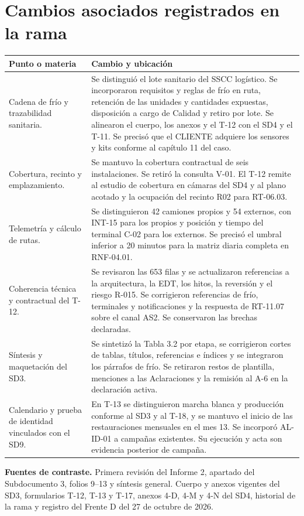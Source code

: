\documentclass[11pt,letterpaper]{article}
\begin{document}
\section*{Cambios asociados registrados en la rama}

\begin{longtable}{@{}P{0.33\textwidth}P{\tabcolsep\relax}@{}}
\hline
\textbf{Punto o materia} & \textbf{Cambio y ubicación} \\
\hline
\endhead
\hline
\endfoot
Cadena de frío y trazabilidad sanitaria. &
Se distinguió el lote sanitario del SSCC logístico. Se incorporaron requisitos y reglas de frío en ruta, retención de las unidades y cantidades expuestas, disposición a cargo de Calidad y retiro por lote. Se alinearon el cuerpo, los anexos y el T-12 con el SD4 y el T-11. Se precisó que el CLIENTE adquiere los sensores y kits conforme al capítulo 11 del caso. \\
Cobertura, recinto y emplazamiento. &
Se mantuvo la cobertura contractual de seis instalaciones. Se retiró la consulta V-01. El T-12 remite al estudio de cobertura en cámaras del SD4 y al plano acotado y la ocupación del recinto R02 para RT-06.03. \\
Telemetría y cálculo de rutas. &
Se distinguieron 42 camiones propios y 54 externos, con INT-15 para los propios y posición y tiempo del terminal C-02 para los externos. Se precisó el umbral inferior a 20 minutos para la matriz diaria completa en RNF-04.01. \\
Coherencia técnica y contractual del T-12. &
Se revisaron las 653 filas y se actualizaron referencias a la arquitectura, la EDT, los hitos, la reversión y el riesgo R-015. Se corrigieron referencias de frío, terminales y notificaciones y la respuesta de RT-11.07 sobre el canal AS2. Se conservaron las brechas declaradas. \\
Síntesis y maquetación del SD3. &
Se sintetizó la Tabla 3.2 por etapa, se corrigieron cortes de tablas, títulos, referencias e índices y se integraron los párrafos de frío. Se retiraron restos de plantilla, menciones a las Aclaraciones y la remisión al A-6 en la declaración activa. \\
Calendario y prueba de identidad vinculados con el SD9. &
En T-13 se distinguieron marcha blanca y producción conforme al SD3 y al T-18, y se mantuvo el inicio de las restauraciones mensuales en el mes 13. Se incorporó AL-ID-01 a campañas existentes. Su ejecución y acta son evidencia posterior de campaña. \\
\end{longtable}

\textbf{Fuentes de contraste.} Primera revisión del Informe 2, apartado del Subdocumento 3, folios 9--13 y síntesis general. Cuerpo y anexos vigentes del SD3, formularios T-12, T-13 y T-17, anexos 4-D, 4-M y 4-N del SD4, historial de la rama y registro del Frente D del 27 de octubre de 2026.
\end{document}
